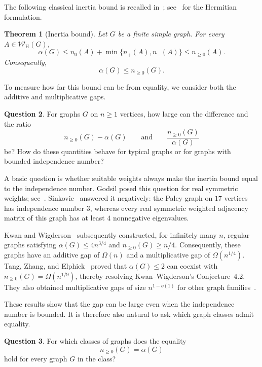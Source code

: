 \documentclass[11pt]{article}
\numberwithin{equation}{section}
\newtheorem{theorem}{Theorem}[section]
\theoremstyle{definition}
\newtheorem{question}[theorem]{Question}
\theoremstyle{remark}
\newcommand{\W}{\mathcal W_{\mathrm H}}
\begin{document}
The following classical inertia bound is recalled
in~\cite[Theorem~1.2]{KW}; see~\cite[equation~(1.1)]{TZE}
for the Hermitian formulation.
\begin{theorem}[Inertia bound]\label{thm:inertia-bound}
Let $G$ be a finite simple graph. For every $A\in\W(G)$,
\[
 \alpha(G)\leq n_0(A)+\min\{n_+(A),n_-(A)\}
 \leq n_{\geq0}(A).
\]
Consequently,
\begin{equation}\label{eq:alpha-inertia}
 \alpha(G)\leq n_{\geq0}(G).
\end{equation}
\end{theorem}

To measure how far this bound can be from equality, we consider
both the additive and multiplicative gaps.
\begin{question}\label{ques:inertia-gap}
For graphs $G$ on $n\geq1$ vertices, how large can the difference
and the ratio
\[
 n_{\geq0}(G)-\alpha(G)
 \qquad\text{and}\qquad
 \frac{n_{\geq0}(G)}{\alpha(G)}
\]
be? How do these quantities behave for typical graphs or for graphs
with bounded independence number?
\end{question}

A basic question is whether suitable weights always make the inertia
bound equal to the independence number. Godsil posed this question
for real symmetric weights; see~\cite[Question~1.3]{KW}.
Sinkovic~\cite{Sinkovic} answered it negatively: the Paley graph on
$17$ vertices has independence number $3$, whereas every real
symmetric weighted adjacency matrix of this graph has at least $4$
nonnegative eigenvalues.

Kwan and Wigderson~\cite[Theorem~1.6]{KW} subsequently constructed,
for infinitely many $n$, regular graphs satisfying
$\alpha(G)\leq4n^{3/4}$ and $n_{\geq0}(G)\geq n/4$.
Consequently, these graphs have an additive gap of $\Omega(n)$
and a multiplicative gap of $\Omega(n^{1/4})$.
Tang, Zhang, and Elphick~\cite[Theorem~1.2]{TZE} proved that
$\alpha(G)\leq2$ can coexist with $n_{\geq0}(G)=\Omega(n^{1/9})$,
thereby resolving Kwan--Wigderson's Conjecture~4.2.
They also obtained multiplicative gaps of size $n^{1-o(1)}$
for other graph families~\cite[Proposition~1.5]{TZE}.

These results show that the gap can be large even when the
independence number is bounded. It is therefore also natural to
ask which graph classes admit equality.
\begin{question}\label{ques:inertia-equality}
For which classes of graphs does the equality
\[
 n_{\geq0}(G)=\alpha(G)
\]
hold for every graph $G$ in the class?
\end{question}
\end{document}
